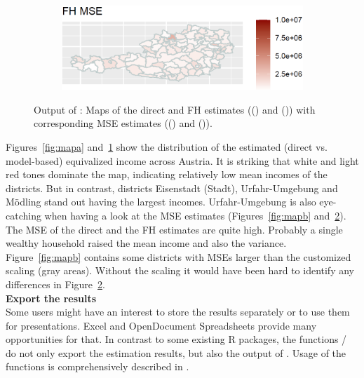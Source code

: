 \begin{figure}[H]
\begin{subfigure}[t]{0.49\textwidth}
		\caption{}
		\label{fig:mapc}
	\end{subfigure}\hfill%
	\begin{subfigure}[t]{0.49\textwidth}
		\includegraphics[width=\textwidth]{figures/map4.png}
		\caption{}
		\label{fig:mapd}
	\end{subfigure}%
	\caption{Output of : Maps of the direct and FH estimates (() and ()) with corresponding MSE estimates (() and ()).}
	\label{fig:mapplot}
\end{figure}
Figures~\ref{fig:mapa} and~\ref{fig:mapc} show the distribution of the estimated
(direct vs. model-based) equivalized income across Austria. It is striking that
white and light red tones dominate the map, indicating relatively low mean
incomes of the districts. But in contrast, districts Eisenstadt
(Stadt), Urfahr-Umgebung and M\"odling stand out having the largest incomes.
Urfahr-Umgebung is also eye-catching when having a look at the MSE estimates
(Figures~\ref{fig:mapb} and~\ref{fig:mapd}). The MSE of the direct and the FH
estimates are quite high. Probably a single wealthy household raised the mean
income and also the variance. Figure~\ref{fig:mapb} contains some districts with
MSEs larger than the customized scaling (gray areas). Without the scaling it would
have been hard to identify any differences in Figure~\ref{fig:mapd}.	
\\ \newline
\textbf{Export the results} \\
Some users might have an interest to store the results separately or to use them
for presentations. Excel and OpenDocument Spreadsheets provide many opportunities for that. In contrast
to some existing R packages, the  functions /
do not only export the estimation results, but also the output of . Usage of the functions is comprehensively described in \citet{emdi2019}.

